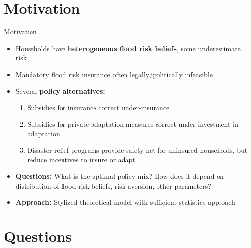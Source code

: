 \documentclass[xcolor=dvipsnames, aspectratio = 169]{beamer}
\begin{document}
\maketitle

{ %
\AtBeginSection{} %

\section{Motivation}

\begin{frame}{Motivation}
    \begin{itemize}
    	\setlength{\itemsep}{0.3cm}
        \item Households have \textbf{heterogeneous flood risk beliefs}, some underestimate risk
        \item Mandatory flood risk insurance often legally/politically infeasible 
        \item Several \textbf{policy alternatives:} 
        \begin{enumerate}[label=\arabic*.] 
            \item Subsidies for insurance correct under-insurance
            \item Subsidies for private adaptation measures correct under-investment in adaptation
            \item Disaster relief programs provide safety net for uninsured households, but reduce incentives to insure or adapt
        \end{enumerate}
        \item \textbf{Questions:} What is the optimal policy mix? How does it depend on distribution of flood risk beliefs, risk aversion, other parameters?
        \item \textbf{Approach:} Stylized theoretical model with sufficient statistics approach
    \end{itemize}
\end{frame}

\section{Questions}

}
\end{document}
